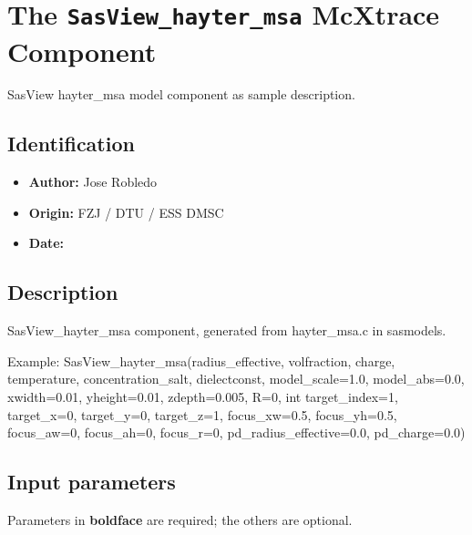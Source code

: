 \section{The \texttt{SasView\_hayter\_msa} McXtrace Component}
SasView hayter\_msa model component as sample description.

\subsection*{Identification}
\begin{itemize}
  \item \textbf{Author:} Jose Robledo
  \item \textbf{Origin:} FZJ / DTU / ESS DMSC
  \item \textbf{Date:} 
\end{itemize}

\subsection*{Description}
SasView\_hayter\_msa component, generated from hayter\_msa.c in sasmodels.

Example: SasView\_hayter\_msa(radius\_effective, volfraction, charge, temperature, concentration\_salt, dielectconst, model\_scale=1.0, model\_abs=0.0, xwidth=0.01, yheight=0.01, zdepth=0.005, R=0, int target\_index=1, target\_x=0, target\_y=0, target\_z=1, focus\_xw=0.5, focus\_yh=0.5, focus\_aw=0, focus\_ah=0, focus\_r=0, pd\_radius\_effective=0.0, pd\_charge=0.0)

\subsection*{Input parameters}
Parameters in \textbf{boldface} are required; the others are optional.

